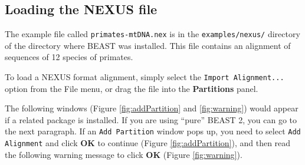\documentclass[11pt]{article}
\newcommand{\TODO}[1]{}
\theoremstyle{plain}%
\theoremstyle{definition}
\theoremstyle{remark}
\begin{document}
\subsection{Loading the NEXUS file }

The example file called \texttt{primates-mtDNA.nex} is in the {\tt examples/nexus/} directory of the directory where BEAST was installed.
This file contains an alignment of sequences of 12 species of primates. 
%
%
%

To load a NEXUS format alignment, simply select the \texttt{Import Alignment...} option from the File menu, or drag the file into the {\bf Partitions} panel. 

%
%

The following windows (Figure \ref{fig:addPartition} and \ref{fig:warning}) would appear if a related package is installed. If you are using ``pure'' BEAST 2, you can go to the next paragraph.    
If an \texttt{Add Partition} window pops up, you need to select \texttt{Add Alignment} and click \textbf{OK} to continue (Figure \ref{fig:addPartition}), and then read the following warning message to click \textbf{OK} (Figure \ref{fig:warning}).
\end{document}

